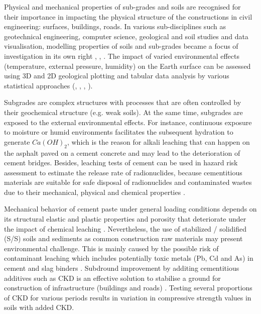 \documentclass[a4paper,fleqn]{cas-dc}
\begin{document}
Physical and mechanical properties of sub-grades and soils are recognised for their importance in impacting the physical structure of the constructions in civil engineering: surfaces, buildings, roads. In various sub-disciplines such as geotechnical engineering, computer science, geological and soil studies and data visualisation, modelling properties of soils and sub-grades became a focus of investigation in its own right  \cite{Lindh2004}, \cite{LI2017459}, \cite{Lemenkova202107}. The impact of varied environmental effects (temperature, external pressure, humidity) on the Earth surface can be assessed using 3D and 2D geological plotting and tabular data analysis by various statistical approaches (\cite{Lindh1999}, \cite{NOSJEAN202031}, \cite{Lemenkova202103}, \cite{ZAHRAN202094}). 

Subgrades are complex structures with processes that are often controlled by their geochemical structure (e.g. weak soils). At the same time, subgrades are exposed to the external environmental effects. For instance, continuous exposure to moisture or humid environments facilitates the subsequent hydration to generate $Ca(OH)_2$, which is the reason for alkali leaching that can happen on the asphalt paved on a cement concrete \citep{SUN2021123255} and may lead to the deterioration of cement bridges. Besides, leaching tests of cement can be used in hazard risk assessment to estimate the release rate of radionuclides, because cementitious materials are suitable for safe disposal of radionuclides and contaminated wastes due to their mechanical, physical and chemical properties \citep{SAMI2021106357}. 

Mechanical behavior of cement paste  under general loading conditions depends on its structural elastic and plastic properties and porosity that deteriorate under the impact of chemical leaching \citep{SHEN2020103571}. Nevertheless, the use of stabilized / solidified (S/S) soils and sediments as common construction raw materials may present environmental challenge. This is mainly caused by the possible risk of contaminant leaching which  includes potentially toxic metals (Pb, Cd and As) in cement and slag binders \citep{ZHANG2021128926}. Subdround improvement by additing cementitious additives such as CKD is an effective solution to stabilise a ground for construction of  infrastructure (buildings and roads) \cite{RIMAL2019e00223}. Testing several proportions of CKD for various periods results in variation in  compressive strength values in soils with added CKD. 
\end{document}
